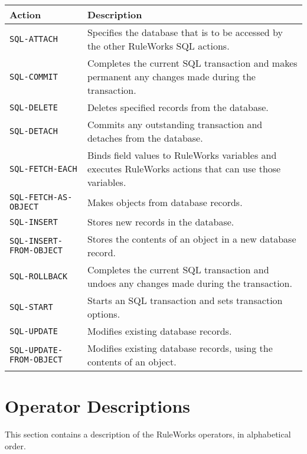 \begin{longtable}{p{5cm}p{10cm}}
  \toprule
  Action & Description \\
  \midrule
  \tt{SQL-ATTACH} & Specifies the database that is to be
                    accessed by the other RuleWorks SQL
                    actions. \\\addlinespace
  \tt{SQL-COMMIT} & Completes the current SQL 
                    transaction and makes permanent any 
                    changes made during the transaction. \\\addlinespace
  \tt{SQL-DELETE} & Deletes specified records from the 
                    database. \\\addlinespace
  \tt{SQL-DETACH} & Commits any outstanding transaction
                    and detaches from the database. \\\addlinespace
  \tt{SQL-FETCH-EACH} & Binds field values to RuleWorks 
                        variables and executes RuleWorks 
                        actions that can use those 
                        variables. \\\addlinespace
  \tt{SQL-FETCH-AS-OBJECT} & Makes objects from database records. \\\addlinespace
  \tt{SQL-INSERT} & Stores new records in the database. \\\addlinespace
  \tt{SQL-INSERT-FROM-OBJECT} & Stores the contents of an object in
                                a new database record. \\\addlinespace
  \tt{SQL-ROLLBACK} & Completes the current SQL 
                      transaction and undoes any changes
                      made during the transaction. \\\addlinespace
  \tt{SQL-START} & Starts an SQL transaction and sets 
                   transaction options. \\\addlinespace
  \tt{SQL-UPDATE} & Modifies existing database records. \\\addlinespace
  \tt{SQL-UPDATE-FROM-OBJECT} & Modifies existing database records,
                                using the contents of an object. \\
  \bottomrule
\end{longtable}

\section{Operator Descriptions}

This section contains a description of the RuleWorks operators,
in alphabetical order.

